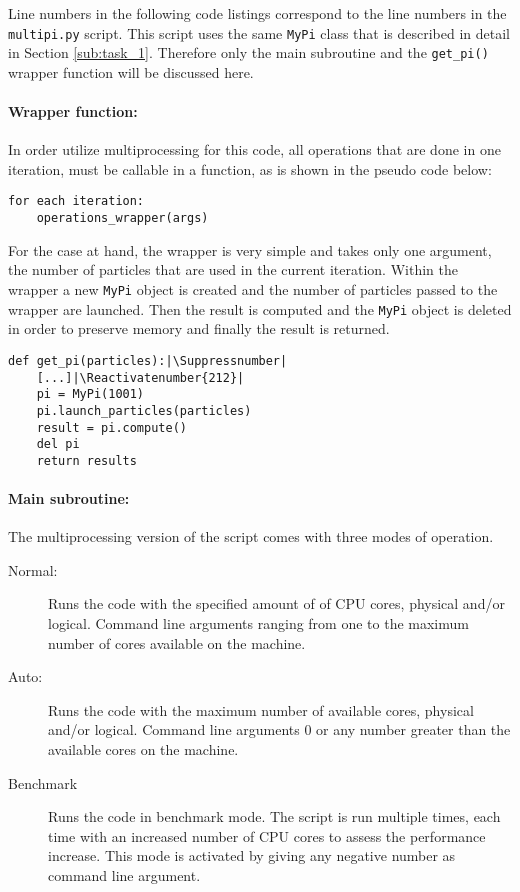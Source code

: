 \documentclass{aa}
\begin{document}
Line numbers in the following code listings correspond to the line numbers in the
\verb+multipi.py+ script. This script uses the same \verb+MyPi+ class that is described in
detail in Section \ref{sub:task_1}. Therefore only the main subroutine and the \verb+get_pi()+
wrapper function will be discussed here.

\paragraph{Wrapper function:} In order utilize multiprocessing for this code, all operations
that are done in one iteration, must be callable in a function, as is shown in the pseudo code
below:
\begin{lstlisting}[numbers=none]
for each iteration:
    operations_wrapper(args)
\end{lstlisting}
For the case at hand, the wrapper is very simple and takes only one argument, the number of
particles that are used in the current iteration. Within the wrapper a new \verb+MyPi+ object
is created and the number of particles passed to the wrapper are launched. Then the result is
computed and the \verb+MyPi+ object is deleted in order to preserve memory and finally the
result is returned.
\begin{lstlisting}[firstnumber=210]
def get_pi(particles):|\Suppressnumber|
    [...]|\Reactivatenumber{212}|
    pi = MyPi(1001)
    pi.launch_particles(particles)
    result = pi.compute()
    del pi
    return results
\end{lstlisting}

\paragraph{Main subroutine:} The multiprocessing version of the script comes with three modes
of operation.
\begin{description}
    \item[Normal:] Runs the code with the specified amount of of CPU cores, physical and/or
        logical. Command line arguments ranging from one to the maximum number of cores
        available on the machine.
    \item[Auto:] Runs the code with the maximum number of available cores, physical and/or
        logical. Command line arguments \(0\) or any number greater than the available cores on
        the machine.
    \item[Benchmark] Runs the code in benchmark mode. The script is run multiple times, each
        time with an increased number of CPU cores to assess the performance increase. This
        mode is activated by giving any negative number as command line argument.
\end{description}
\end{document}
